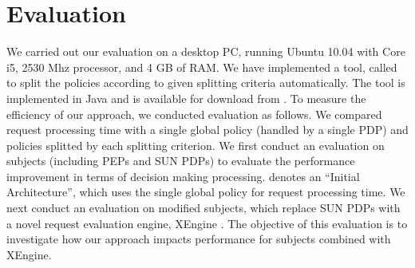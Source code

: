 \section{Evaluation} \label{sec:experiment}

We carried out our evaluation on a desktop PC, running Ubuntu 10.04 with Core i5, 2530 Mhz processor, and 4 GB of RAM. 
We have implemented a tool, called  to split the policies according to given splitting criteria automatically.
The tool is implemented in Java and is available for download from \cite{splitter}.
To measure the efficiency of our approach, we conducted evaluation as follows. 
We compared request processing time with a single global policy (handled by a single PDP) and policies splitted by each splitting criterion.
We first conduct an evaluation on subjects (including PEPs and SUN PDPs) to evaluate the performance improvement in terms of decision making processing.  denotes an ``Initial Architecture'', which uses the single global policy for request processing time.
We next conduct an evaluation on modified subjects, which replace SUN PDPs with a novel request evaluation engine, XEngine \cite{Xengine}. The objective of this evaluation is to investigate how our approach impacts performance for subjects combined with XEngine.



  


